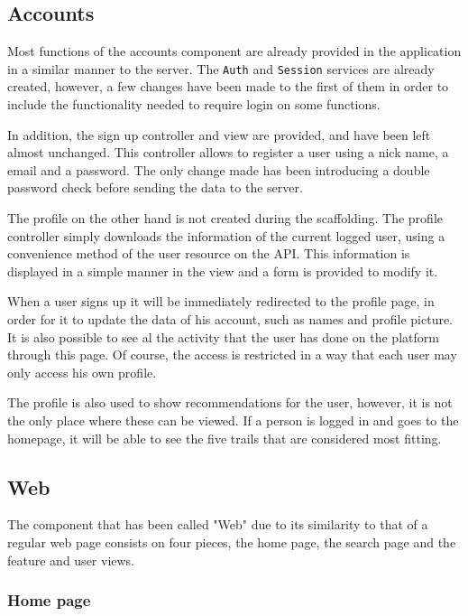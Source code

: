 \subsection{Accounts}

Most functions of the accounts component are already provided in the application in a similar manner to the server. The \texttt{Auth} and \texttt{Session} services are already created, however, a few changes have been made to the first of them in order to include the functionality needed to require login on some functions.

In addition, the sign up controller and view are provided, and have been left almost unchanged. This controller allows to register a user using a nick name, a email and a password. The only change made has been introducing a double password check before sending the data to the server.

The profile on the other hand is not created during the scaffolding. The profile controller simply downloads the information of the current logged user, using a convenience method of the user resource on the API. This information is displayed in a simple manner in the view and a form is provided to modify it.

When a user signs up it will be immediately redirected to the profile page, in order for it to update the data of his account, such as names and profile picture. It is also possible to see al the activity that the user has done on the platform through this page. Of course, the access is restricted in a way that each user may only access his own profile.

The profile is also used to show recommendations for the user, however, it is not the only place where these can be viewed. If a person is logged in and goes to the homepage, it will be able to see the five trails that are considered most fitting.

\subsection{Web}

The component that has been called "Web" due to its similarity to that of a regular web page consists on four pieces, the home page, the search page and the feature and user views.

\subsubsection*{Home page}

